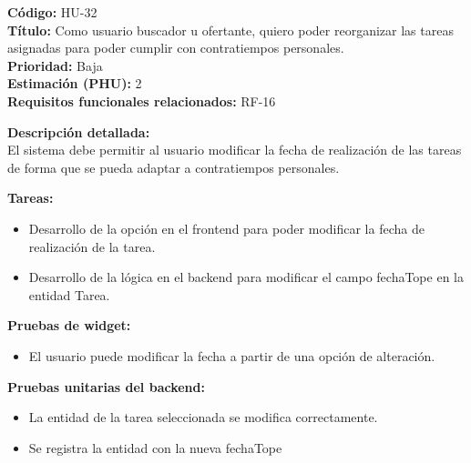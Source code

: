 \begin{tarjetaHU}
\textbf{Código:} HU-32 \\
\textbf{Título:} Como usuario buscador u ofertante, quiero poder reorganizar las tareas asignadas para poder cumplir con contratiempos personales. \\
\textbf{Prioridad:} Baja \\
\textbf{Estimación (PHU):} 2 \\
\textbf{Requisitos funcionales relacionados:} RF-16

\vspace{0.5em}
\textbf{Descripción detallada:} \\
El sistema debe permitir al usuario modificar la fecha de realización de las tareas de forma que se pueda adaptar a contratiempos personales.

\vspace{0.5em}
\textbf{Tareas:}
\begin{itemize}[left=0pt]
  \item Desarrollo de la opción en el frontend para poder modificar la fecha de realización de la tarea.
  \item Desarrollo de la lógica en el backend para modificar el campo fechaTope en la entidad Tarea.
\end{itemize}

\vspace{0.5em}
\textbf{Pruebas de widget:}
\begin{itemize}[left=0pt]
  \item El usuario puede modificar la fecha a partir de una opción de alteración.
\end{itemize}
\textbf{Pruebas unitarias del backend:}
\begin{itemize}[left=0pt]
  \item La entidad de la tarea seleccionada se modifica correctamente.
  \item Se registra la entidad con la nueva fechaTope
\end{itemize}
\end{tarjetaHU}

